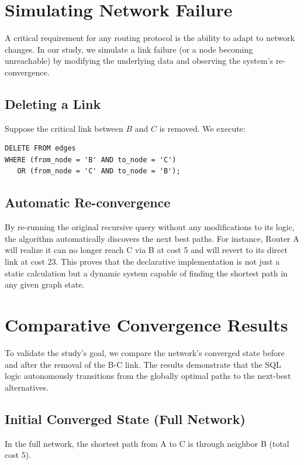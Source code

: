 \documentclass[twocolumn,a4paper,10pt]{article}
\begin{document}
\section{Simulating Network Failure}
A critical requirement for any routing protocol is the ability to adapt to network changes. In our study, we simulate a link failure (or a node becoming unreachable) by modifying the underlying data and observing the system's re-convergence.

\subsection{Deleting a Link}
Suppose the critical link between $B$ and $C$ is removed. We execute:
\begin{lstlisting}
DELETE FROM edges
WHERE (from_node = 'B' AND to_node = 'C')
   OR (from_node = 'C' AND to_node = 'B');
\end{lstlisting}

\subsection{Automatic Re-convergence}
By re-running the original recursive query without any modifications to its logic, the algorithm automatically discovers the next best paths. For instance, Router A will realize it can no longer reach C via B at cost 5 and will revert to its direct link at cost 23. This proves that the declarative implementation is not just a static calculation but a dynamic system capable of finding the shortest path in any given graph state.

\section{Comparative Convergence Results}
To validate the study's goal, we compare the network's converged state before and after the removal of the B-C link. The results demonstrate that the SQL logic autonomously transitions from the globally optimal paths to the next-best alternatives.

\subsection{Initial Converged State (Full Network)}
In the full network, the shortest path from A to C is through neighbor B (total cost 5). 
\end{document}
